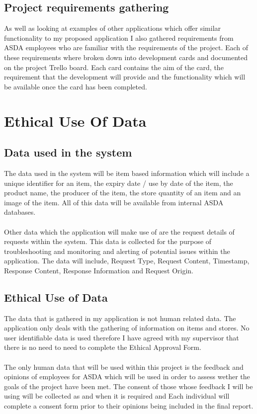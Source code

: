 \documentclass[a4paper,11pt]{report}
\begin{document}
\section{Project requirements gathering}

As well as looking at examples of other applications which offer similar functionality to my proposed
application I also gathered requirements from ASDA employees who are familiar with the requirements 
of the project. Each of these requirements where broken down into development cards and documented on
the project Trello board. Each card contains the aim of the card, the requirement that the development
will provide and the functionality which will be available once the card has been completed. 




\chapter{Ethical Use Of Data}
\section{Data used in the system}
The data used in the system will be item based information which will include a unique identifier
for an item, the expiry date / use by date of the item, the product name, the producer of the item, 
the store quantity of an item and an image of the item. 
All of this data will be available from internal ASDA databases. 
\\
\\
Other data which the application will make use of are the request details of requests 
within the system. This data is collected for the purpose of troubleshooting and monitoring
and alerting of potential issues within the application. The data will include, Request Type,
Request Content, Timestamp, Response Content, Response Information and Request Origin.
   
   
\section{Ethical Use of Data}
The data that is gathered in my application is not human related data.
The application only deals with the gathering of information on items and stores.
No user identifiable data is used therefore I have agreed with my supervisor that
there is no need to need to complete the Ethical Approval Form.
\\
\\
The only human data that will be used within this project is the feedback and opinions
of employees for ASDA which will be used in order to assess wether the goals of the 
project have been met. The consent of those whose feedback I will be using will be 
collected as and when it is required and Each individual will complete a consent form
prior to their opinions being included in the final report.
\end{document}
